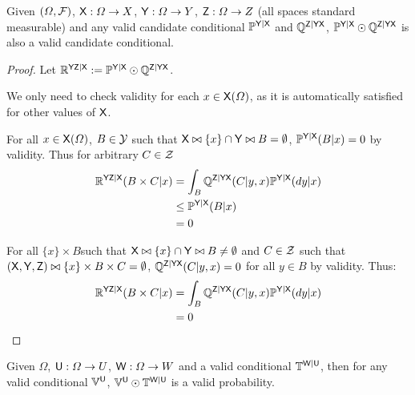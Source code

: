 \begin{theorem}\label{lem:valid_extendability}
Given $(\Omega,\mathcal{F})$, $\mathsf{X}:\Omega\to X$, $\mathsf{Y}:\Omega\to Y$, $\mathsf{Z}:\Omega\to Z$ (all spaces standard measurable) and any valid candidate conditional $\mathbb{P}^{\mathsf{Y}|\mathsf{X}}$ and $\mathbb{Q}^{\mathsf{Z}|\mathsf{Y}\mathsf{X}}$, $ \mathbb{P}^{\mathsf{Y}|\mathsf{X}}\odot \mathbb{Q}^{\mathsf{Z}|\mathsf{Y}\mathsf{X}}$ is also a valid candidate conditional.
\end{theorem}

\begin{proof}
Let $\mathbb{R}^{\mathsf{YZ}|\mathsf{X}}:=\mathbb{P}^{\mathsf{Y}|\mathsf{X}}\odot \mathbb{Q}^{\mathsf{Z}|\mathsf{Y}\mathsf{X}}$.

We only need to check validity for each $x\in \mathsf{X}(\Omega)$, as it is automatically satisfied for other values of $\mathsf{X}$.

For all $x\in \mathsf{X}(\Omega)$, $B\in \mathcal{Y}$ such that $\mathsf{X}\bowtie \{x\}\cap\mathsf{Y}\bowtie B=\emptyset$, $\mathbb{P}^{\mathsf{Y}|\mathsf{X}}(B|x)=0$ by validity. Thus for arbitrary $C\in \mathcal{Z}$
\begin{align}
    \mathbb{R}^{\mathsf{YZ}|\mathsf{X}}(B\times C|x) &= \int_B \mathbb{Q}^{\mathsf{Z}|\mathsf{YX}}(C|y,x)\mathbb{P}^{\mathsf{Y}|\mathsf{X}}(dy|x)\\
                                  &\leq \mathbb{P}^{\mathsf{Y}|\mathsf{X}}(B|x)\\
                                  &=0
\end{align}

For all $\{x\}\times B$such that $\mathsf{X}\bowtie \{x\}\cap\mathsf{Y}\bowtie B\neq \emptyset$ and $C\in \mathcal{Z}$ such that $(\mathsf{X},\mathsf{Y},\mathsf{Z})\bowtie \{x\}\times B\times C=\emptyset$, $\mathbb{Q}^{\mathsf{Z}|\mathsf{YX}}(C|y,x)=0$ for all $y\in B$ by validity. Thus:
\begin{align}
    \mathbb{R}^{\mathsf{YZ}|\mathsf{X}}(B\times C|x) &= \int_B \mathbb{Q}^{\mathsf{Z}|\mathsf{YX}}(C|y,x)\mathbb{P}^{\mathsf{Y}|\mathsf{X}}(dy|x)\\
                                            &=0
\end{align}
\end{proof}

\begin{corollary}\label{corr:valid_extend_order1}
Given $\Omega$, $\mathsf{U}:\Omega\to U$, $\mathsf{W}:\Omega\to W$ and a valid conditional $\mathbb{T}^{\mathsf{W}|\mathsf{U}}$, then for any valid conditional $\mathbb{V}^{\mathsf{U}}$, $\mathbb{V}^{\mathsf{U}}\odot \mathbb{T}^{\mathsf{W}|\mathsf{U}}$ is a valid probability.
\end{corollary}

